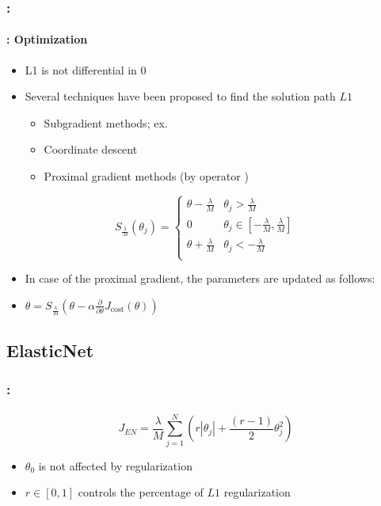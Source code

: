 \documentclass[xcolor=table]{beamer}%
\begin{document}
\begin{frame}
	\frametitle{\insertshortsubtitle: \insertsection}
	\framesubtitle{\insertsubsection: Optimization}

	\begin{itemize}
		\item L1 is not differential in $0$
		\item Several techniques have been proposed to find the solution path $L1$
		\begin{itemize}
			\item Subgradient methods; ex. 
			\item Coordinate descent
			\item Proximal gradient methods (by operator )
		\end{itemize}
	\end{itemize}

	\[S_\frac{\lambda}{M} (\theta_j) = 
	\begin{cases}
		\theta - \frac{\lambda}{M} & \theta_j > \frac{\lambda}{M} \\
		0 & \theta_j \in [-\frac{\lambda}{M}, \frac{\lambda}{M}] \\
		\theta + \frac{\lambda}{M} & \theta_j < -\frac{\lambda}{M} \\
	\end{cases}
	\]
	
	\begin{itemize}
		\item In case of the proximal gradient, the parameters are updated as follows: 
		\item $\theta = S_\frac{\lambda}{M} (\theta - \alpha \frac{\partial}{\partial \theta} J_\text{cost}(\theta)) $
	\end{itemize}
	
\end{frame}

\subsection{ElasticNet}

\begin{frame}
	\frametitle{\insertshortsubtitle: \insertsection}
	\framesubtitle{\insertsubsection}
	
	\[J_{EN} = \frac{\lambda}{M} \sum_{j=1}^{N} \left( r  |\theta_j| + \frac{(r-1)}{2} \theta_j^2\right)\]
	

	\begin{itemize}
		\item $\theta_0$ is not affected by regularization
		\item $r \in [0, 1]$ controls the percentage of $L1$ regularization
	\end{itemize}
	
\end{frame}
\end{document}
